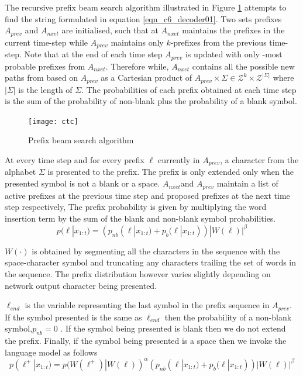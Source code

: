 The recursive prefix beam search algorithm illustrated in Figure \ref{fig_c6_decoder01} attempts to find the string formulated in equation \ref{eqn_c6_decoder01}.  Two sets prefixes $A_{prev}$ and $A_{nxet}$ are initialised, such that at $A_{nxet}$ maintains the prefixes in the current time-step while $A_{prev}$ maintains only $k$-prefixes from the previous time-step.  Note that at the end of each time step $A_{prev}$ is updated with only -most probable prefixes from $A_{nxet}$. Therefore while,  $A_{nxet}$ contains all the possible new paths from based on $A_{prev}$ as a Cartesian product of $A_{prev} \times \Sigma \in \mathcal{Z}^k\times\mathcal{Z}^{|\Sigma|}$ where $|\Sigma|$ is the length of $\Sigma$. The probabilities of each prefix obtained at each time step is the sum of the probability of non-blank plus the probability of a blank symbol.
\begin{figure}
    \texttt{[image: ctc]}
    \caption{Prefix beam search algorithm}
    \label{fig_c6_decoder01}
\end{figure}

At every  time step and for every prefix $\ell$ currently in $A_{prev}$, a character from the alphabet $\Sigma$ is presented to the prefix. The prefix is only extended only when the presented symbol is not a blank or a space. $A_{nxet}$and  $A_{prev}$ maintain a list of active prefixes at the previous time step and proposed prefixes at the next time step respectively, The prefix probability is given by multiplying the word insertion term by the sum of the blank and non-blank symbol probabilities.
\begin{equation}
p(\ell|x_{1:t})=(p_{nb}(\ell|x_{1:t})+p_b(\ell|x_{1:t}))|W(\ell)|^\beta
\label{eqn_c6_decoder03}
\end{equation}

$W(\cdot)$ is obtained by segmenting all the characters in the sequence with the space-character symbol and truncating any characters trailing the  set of words in the sequence.  The prefix distribution however varies slightly depending on network output character being presented.

$\ell_{end}$ is the variable representing the last symbol in the prefix sequence in $A_{prev}$. If the symbol presented is the same as $\ell_{end}$ then the probability of a non-blank symbol,$p_{nb}=0$ . If the symbol being presented is blank then we do not extend the prefix.  Finally, if the symbol being presented is a space then we invoke the language model as follows
\begin{equation}
p(\ell^+|x_{1:t})=p(W(\ell^+)|W(\ell))^\alpha(p_{nb}(\ell|x_{1:t})+p_b(\ell|x_{1:t}))|W(\ell)|^\beta
\label{eqn_c6_decoder03}
\end{equation}

